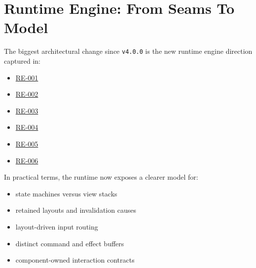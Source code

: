 \section{Runtime Engine: From Seams To Model}\label{record-275-runtime-engine-from-seams-to-model}

The biggest architectural change since \texttt{v\allowbreak{}4\allowbreak{}.\allowbreak{}0\allowbreak{}.\allowbreak{}0} is the new runtime engine direction captured in:

\begin{itemize}
\tightlist
\item
  \href{https://github.com/flyingrobots/bijou/blob/cbd70612140e7a450d764b3c7be1c6af878b99bc/docs/design/RE-001-define-runtime-engine-architecture.md}{RE-001}
\item
  \href{https://github.com/flyingrobots/bijou/blob/cbd70612140e7a450d764b3c7be1c6af878b99bc/docs/design/RE-002-promote-first-class-state-machine-and-view-stack.md}{RE-002}
\item
  \href{https://github.com/flyingrobots/bijou/blob/cbd70612140e7a450d764b3c7be1c6af878b99bc/docs/design/RE-003-retain-layout-trees-and-layout-invalidation.md}{RE-003}
\item
  \href{https://github.com/flyingrobots/bijou/blob/cbd70612140e7a450d764b3c7be1c6af878b99bc/docs/design/RE-004-route-input-through-layouts-and-layer-bubbling.md}{RE-004}
\item
  \href{https://github.com/flyingrobots/bijou/blob/cbd70612140e7a450d764b3c7be1c6af878b99bc/docs/design/RE-005-buffer-commands-and-effects-separately.md}{RE-005}
\item
  \href{https://github.com/flyingrobots/bijou/blob/cbd70612140e7a450d764b3c7be1c6af878b99bc/docs/design/RE-006-formalize-component-layout-and-interaction-contracts.md}{RE-006}
\end{itemize}

In practical terms, the runtime now exposes a clearer model for:

\begin{itemize}
\tightlist
\item
  state machines versus view stacks
\item
  retained layouts and invalidation causes
\item
  layout-driven input routing
\item
  distinct command and effect buffers
\item
  component-owned interaction contracts
\end{itemize}

